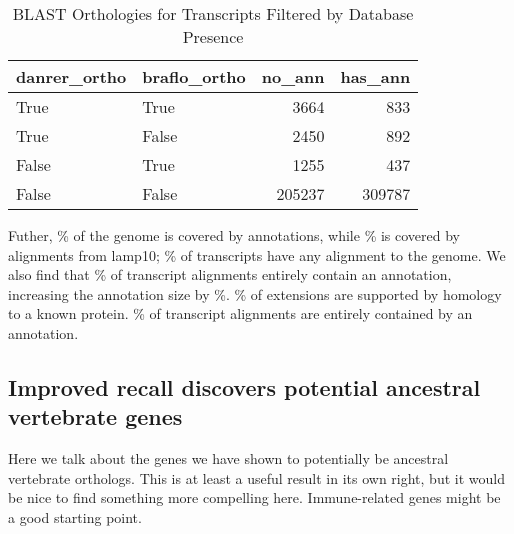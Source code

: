 \documentclass{article}
\begin{document}
\begin{table}[H]
\caption {BLAST Orthologies for Transcripts Filtered by Database Presence}
\begin{center}

\begin{tabular}{llrr}
\toprule
danrer\_ortho & braflo\_ortho &  no\_ann &  has\_ann \\
\midrule
        True &         True &    3664 &      833 \\
        True &        False &    2450 &      892 \\
       False &         True &    1255 &      437 \\
       False &        False &  205237 &   309787 \\
\bottomrule
\end{tabular}



\end{center}
\end{table}


Futher, \% of the genome is covered by annotations, while \% is covered by alignments from lamp10; 
\% of transcripts have any alignment to the genome. We also find that \% of transcript alignments 
entirely contain an annotation, increasing the annotation size by \%. \% of extensions are supported
by homology to a known protein. \% of transcript alignments are entirely contained by an annotation.



\subsection*{Improved recall discovers potential ancestral vertebrate genes}

Here we talk about the genes we have shown to potentially be ancestral vertebrate orthologs. This is
at least a useful result in its own right, but it would be nice to find something more compelling
here. Immune-related genes might be a good starting point.



\end{document}
